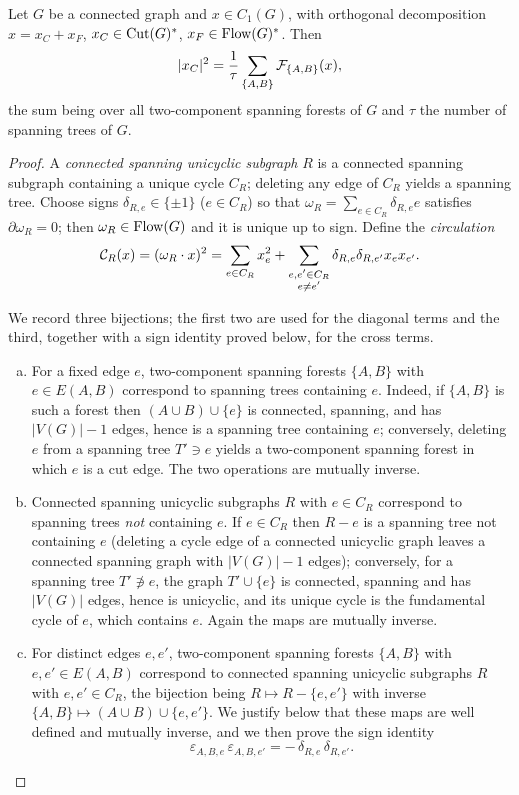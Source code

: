 \begin{lem}
\label{lem:length}
Let $G$ be a connected graph and $x\in C_1(G)$, with orthogonal decomposition
$x=x_C+x_F$, $x_C\in\operatorname{Cut}(G)^\ast$, $x_F\in\operatorname{Flow}(G)^\ast$.  Then
\[
\lvert x_C\rvert^{2}=\frac1\tau\sum_{\{A,B\}}\mathcal{F}_{\{A,B\}}(x),
\]
the sum being over all two-component spanning forests of $G$ and $\tau$ the number of
spanning trees of $G$.
\end{lem}

\begin{proof}
A \emph{connected spanning unicyclic subgraph} $R$ is a connected spanning subgraph
containing a unique cycle $C_R$; deleting any edge of $C_R$ yields a spanning tree.  Choose
signs $\delta_{R,e}\in\{\pm1\}$ ($e\in C_R$) so that
$\omega_R=\sum_{e\in C_R}\delta_{R,e}e$ satisfies $\partial\omega_R=0$; then
$\omega_R\in\operatorname{Flow}(G)$ and it is unique up to sign.  Define the \emph{circulation}
\begin{equation}
\label{eq:circ}
\mathcal{C}_R(x)=(\omega_R\cdot x)^2
=\sum_{e\in C_R}x_e^2+\sum_{\substack{e,e'\in C_R\\ e\ne e'}}\delta_{R,e}\delta_{R,e'}x_ex_{e'} .
\end{equation}

We record three bijections; the first two are used for the diagonal terms and the
third, together with a sign identity proved below, for the cross terms.
\begin{enumerate}[(a)]
\item For a fixed edge $e$, two-component spanning forests $\{A,B\}$ with $e\in E(A,B)$
correspond to spanning trees containing $e$.  Indeed, if $\{A,B\}$ is such a forest then
$(A\cup B)\cup\{e\}$ is connected, spanning, and has $|V(G)|-1$ edges, hence is a spanning
tree containing $e$; conversely, deleting $e$ from a spanning tree $T'\ni e$ yields a
two-component spanning forest in which $e$ is a cut edge.  The two operations are mutually
inverse.
\item Connected spanning unicyclic subgraphs $R$ with $e\in C_R$ correspond to spanning
trees \emph{not} containing $e$.  If $e\in C_R$ then $R-e$ is a spanning tree not containing
$e$ (deleting a cycle edge of a connected unicyclic graph leaves a connected spanning graph
with $|V(G)|-1$ edges); conversely, for a spanning tree $T'\not\ni e$, the graph
$T'\cup\{e\}$ is connected, spanning and has $|V(G)|$ edges, hence is unicyclic, and its
unique cycle is the fundamental cycle of $e$, which contains $e$.  Again the maps are
mutually inverse.
\item For distinct edges $e,e'$, two-component spanning forests $\{A,B\}$ with
$e,e'\in E(A,B)$ correspond to connected spanning unicyclic subgraphs $R$ with
$e,e'\in C_R$, the bijection being $R\mapsto R-\{e,e'\}$ with inverse
$\{A,B\}\mapsto (A\cup B)\cup\{e,e'\}$.  We justify below that these maps are well defined
and mutually inverse, and we then prove the sign identity
\begin{equation}
\label{eq:signid}
\varepsilon_{A,B,e}\,\varepsilon_{A,B,e'}=-\,\delta_{R,e}\,\delta_{R,e'}.
\end{equation}
\end{enumerate}


\end{proof}
